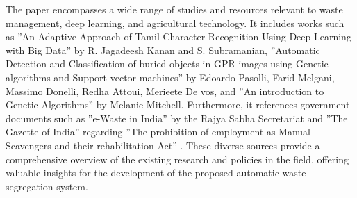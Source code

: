 \documentclass[12pt, English]{article}
\begin{document}
The paper encompasses a wide range of studies and resources relevant to waste management, deep learning, and agricultural technology. It includes works such as ”An Adaptive Approach of Tamil Character Recognition Using Deep Learning with Big Data” by R. Jagadeesh Kanan and S. Subramanian, ”Automatic Detection and Classification of buried objects in GPR images using Genetic algorithms and Support vector machines” by Edoardo Pasolli, Farid Melgani, Massimo Donelli, Redha Attoui, Merieete De vos, and ”An introduction to Genetic Algorithms” by Melanie Mitchell. Furthermore, it references government documents such as ”e-Waste in India” by the Rajya Sabha Secretariat and ”The Gazette of India” regarding ”The prohibition of employment as Manual Scavengers and their rehabilitation Act” . These diverse sources provide a comprehensive overview of the existing research and policies in the field, offering valuable insights for the development of the proposed automatic waste segregation system. \\
\\
\end{document}
